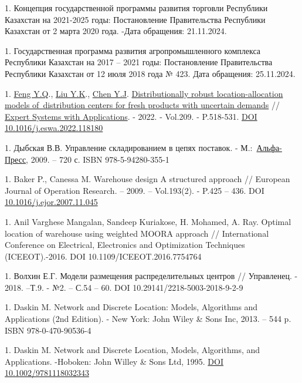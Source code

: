 \begin{references}
1. Концепция государственной программы развития торговли Республики
Казахстан на 2021-2025 годы: Постановление Правительства Республики
Казахстан от 2 марта 2020 года.
\href{https://www.gov.kz/memleket/entities/mti/documents/details/61426?lang=ru}{}
-Дата обращения: 21.11.2024.

1. Государственная программа развития агропромышленного комплекса
Республики Казахстан на 2017 -- 2021 годы: Постановление Правительства
Республики Казахстан от 12 июля 2018 года № 423.
\href{https://adilet.zan.kz/rus/docs/P1800000423-}{}
Дата обращения: 25.11.2024.

1. \href{https://www.webofscience.com/wos/author/record/34864370}{Feng
Y.Q}.,
\href{https://www.webofscience.com/wos/author/record/33997583}{Liu
Y.K}.,
\href{https://www.webofscience.com/wos/author/record/34807908}{Chen
Y.J}.
\href{https://www.webofscience.com/wos/woscc/full-record/WOS:000859686100002}{Distributionally
robust location-allocation models of~distribution centers for fresh
products with uncertain demands} //
\href{https://www.sciencedirect.com/journal/expert-systems-with-applications}{Expert
Systems with Applications}. - 2022. - Vol.209. - P.518-531.
\href{https://doi.org/10.1016/j.eswa.2022.118180}{DOI
10.1016/j.eswa.2022.118180}

1. Дыбская В.В. Управление складированием в цепях поставок. -
М.:~\href{https://publications.hse.ru/books/?pb=57130529}{Альфа-Пресс},
2009. -- 720 с. ISBN 978-5-94280-355-1

1. Baker P., Canessa M. Warehouse design A structured approach //
European Journal of Operation Research. -- 2009. -- Vol.193(2). -
P.425 -- 436. DOI
\href{http://dx.doi.org/10.1016/j.ejor.2007.11.045}{10.1016/j.ejor.2007.11.045}

1. Anil Varghese Mangalan, Sandeep Kuriakose, H. Mohamed, A. Ray. Optimal
location of warehouse using weighted MOORA approach // International
Conference on Electrical, Electronics and Optimization Techniques
(ICEEOT).-2016. DOI 10.1109/ICEEOT.2016.7754764

1. Волхин Е.Г. Модели размещения распределительных центров // Управленец.
- 2018. --Т.9. - №2. -- С.54 -- 60. DOI 10.29141/2218-5003-2018-9-2-9

1. Daskin M. Network and Discrete Location: Models, Algorithms and
Applications (2nd Edition). - New York: John Wiley \& Sons Inc, 2013.
-- 544 p. ISBN 978-0-470-90536-4

1. Daskin M. Network and Discrete Location, Models, Algorithms, and
Applications. -Hoboken: John Willey \& Sons Ltd, 1995.
\href{http://dx.doi.org/10.1002/9781118032343}{DOI
10.1002/9781118032343}


\end{references}
